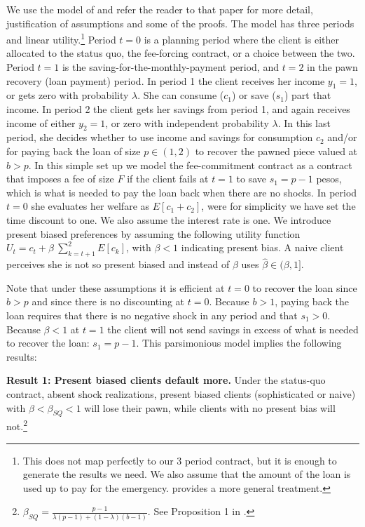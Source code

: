 We use the model of \cite{John} and refer the reader to that paper for more detail, justification of assumptions and some of the proofs. The model has three periods and linear utility.\footnote{This does not map perfectly to our 3 period contract, but it is enough to generate the results we need. We also assume that the amount of the loan is used up to pay for the emergency. \cite{John_theory} provides a more general treatment.} Period $t=0$ is a planning period where the client is either allocated to the status quo, the fee-forcing contract, or a choice between the two. Period $t=1$ is the saving-for-the-monthly-payment  period, and $t=2$ in the pawn recovery (loan payment) period. In period 1 the client receives her income $y_1=1$, or gets zero with probability $\lambda$. She can consume ($c_1$) or save ($s_1$) part that income. In period 2 the client gets her savings from period 1, and again receives income of either $y_2=1$, or zero with independent probability $\lambda$. In this last period, she decides whether to use income and savings for consumption $c_2$ and/or for paying back the loan of size $p \in(1,2)$ to recover the pawned piece valued at $b>p$. In this simple set up we model the fee-commitment contract as a contract that imposes a fee of size $F$ if the client fails at $t=1$ to save $s_1=p-1$ pesos, which is what is needed to pay the loan back when there are no shocks. In period $t=0$ she evaluates her welfare as $E[c_1+c_2]$, were for simplicity we have set the time discount to one. We also assume the interest rate is one. We introduce present biased preferences by assuming the following utility function $U_t=c_t+\beta \: \sum_{k=t+1}^{2} E[c_k]$, with $\beta<1$ indicating present bias. A naive client perceives she is not so present biased and instead of $\beta$ uses $\hat{\beta} \in (\beta,1]$. 

Note that under these assumptions it is efficient at $t=0$ to recover the loan since $b>p$ and since there is no discounting at $t=0$. Because $b>1$, paying back the loan requires that there is no negative shock in any period and that $s_1>0$. Because $\beta<1$ at $t=1$ the client will not send savings in excess of what is needed to recover the loan: $s_1=p-1$. This parsimonious model implies the following results:

\vspace{.2in}
\noindent \textbf{Result 1: Present biased clients default more.} Under the status-quo contract, absent shock realizations, present biased clients (sophisticated or naive) with $\beta<\beta_{SQ}<1$ will lose their pawn, while clients with no present bias will not.\footnote{$\beta_{SQ}=\frac{p-1}{\lambda(p-1)+(1-\lambda)(b-1)}$. See Proposition 1 in \cite{John}.} 

